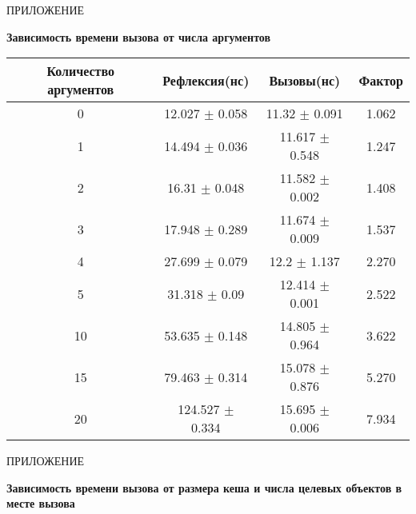 \vfill
\clearpage
\appendix

    \hfill ПРИЛОЖЕНИЕ 
    \begin{center}
        \bf{Зависимость времени вызова от числа аргументов}
    \end{center}
    \markboth{\MakeUppercase{}}{}

\begin{table}[H]
\begin{center}
\begin{tabular}{|c|c|c|c|} \hline
Количество аргументов & Рефлексия(нс) &  Вызовы(нс) & Фактор \\ \hline
0 & 12.027 $\pm$ 0.058 & 11.32 $\pm$ 0.091 & 1.062 \\ \hline
1 & 14.494 $\pm$ 0.036 & 11.617 $\pm$ 0.548 & 1.247 \\ \hline
2 & 16.31 $\pm$ 0.048 & 11.582 $\pm$ 0.002 & 1.408 \\ \hline
3 & 17.948 $\pm$ 0.289 & 11.674 $\pm$ 0.009 & 1.537 \\ \hline
4 & 27.699 $\pm$ 0.079 & 12.2 $\pm$ 1.137 & 2.270 \\ \hline
5 & 31.318 $\pm$ 0.09 & 12.414 $\pm$ 0.001 & 2.522 \\ \hline
10 & 53.635 $\pm$ 0.148 & 14.805 $\pm$ 0.964 & 3.622 \\ \hline
15 & 79.463 $\pm$ 0.314 & 15.078 $\pm$ 0.876 & 5.270 \\ \hline
20 & 124.527 $\pm$ 0.334 & 15.695 $\pm$ 0.006 & 7.934 \\ \hline
\end{tabular}
\end{center}
\end{table}

\newpage

    \hfill ПРИЛОЖЕНИЕ 
    \begin{center}
        \bf{Зависимость времени вызова от размера кеша и числа целевых объектов в месте вызова}
    \end{center}
    \markboth{\MakeUppercase{}}{}

